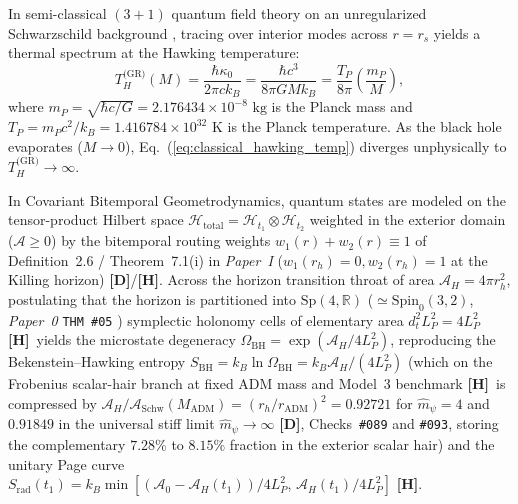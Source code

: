 \documentclass[11pt,a4paper]{article}
\newcommand{\catD}{\textbf{\textcolor{blue!75!black}{[D]}}}
\newcommand{\catH}{\textbf{\textcolor{orange!85!black}{[H]}}}
\theoremstyle{plain}
\theoremstyle{definition}
\theoremstyle{remark}
\numberwithin{equation}{section}
\begin{document}
In semi-classical $(3+1)$ quantum field theory on an unregularized Schwarzschild background \cite{hawking1975,unruh1976}, tracing over interior modes across $r = r_s$ yields a thermal spectrum at the Hawking temperature:
\begin{equation}
T_H^{\text{(GR)}}(M) = \frac{\hbar \kappa_0}{2\pi c k_B} = \frac{\hbar c^3}{8\pi G M k_B} = \frac{T_P}{8\pi} \left(\frac{m_P}{M}\right),
\label{eq:classical_hawking_temp}
\end{equation}
where $m_P = \sqrt{\hbar c / G} = 2.176434 \times 10^{-8}\text{ kg}$ is the Planck mass and $T_P = m_P c^2 / k_B = 1.416784 \times 10^{32}\text{ K}$ is the Planck temperature. As the black hole evaporates ($M \to 0$), Eq.~(\ref{eq:classical_hawking_temp}) diverges unphysically to $T_H^{\text{(GR)}} \to \infty$.

In Covariant Bitemporal Geometrodynamics, quantum states are modeled on the tensor-product Hilbert space $\mathcal{H}_{\text{total}} = \mathcal{H}_{t_1} \otimes \mathcal{H}_{t_2}$ weighted in the exterior domain ($\mathcal{A} \ge 0$) by the bitemporal routing weights $w_1(r) + w_2(r) \equiv 1$ of Definition~2.6 / Theorem~7.1(i) in \textit{Paper~I} \cite{jimenez2026a} ($w_1(r_h) = 0, w_2(r_h) = 1$ at the Killing horizon) \catD/\catH. Across the horizon transition throat of area $\mathcal{A}_H = 4\pi r_h^2$, postulating that the horizon is partitioned into $\text{Sp}(4,\mathbb{R})$ ($\simeq \text{Spin}_0(3,2)$, \textit{Paper~0} \texttt{THM~\#05} \cite{jimenez2026_p0}) symplectic holonomy cells of elementary area $d_t^2 L_P^2 = 4L_P^2$ \catH\ yields the microstate degeneracy $\Omega_{\text{BH}} = \exp(\mathcal{A}_H / 4L_P^2)$, reproducing the Bekenstein--Hawking entropy $S_{\text{BH}} = k_B \ln \Omega_{\text{BH}} = k_B \mathcal{A}_H / (4L_P^2)$ (which on the Frobenius scalar-hair branch at fixed ADM mass and Model~3 benchmark \catH\ is compressed by $\mathcal{A}_H/\mathcal{A}_{\text{Schw}}(M_{\text{ADM}}) = (r_h/r_{\text{ADM}})^2 = 0.92721$ for $\hat{m}_{\psi} = 4$ and $\mathbf{0.91849}$ in the universal stiff limit $\hat{m}_{\psi} \to \infty$ \catD, Checks~\texttt{\#089} and \texttt{\#093}, storing the complementary $7.28\%$ to $8.15\%$ fraction in the exterior scalar hair) and the unitary Page curve $S_{\text{rad}}(t_1) = k_B \min[(\mathcal{A}_0 - \mathcal{A}_H(t_1))/4L_P^2,\, \mathcal{A}_H(t_1)/4L_P^2]$ \cite{page1993,almheiri2020,JV_CycleII} \catH.
\end{document}
